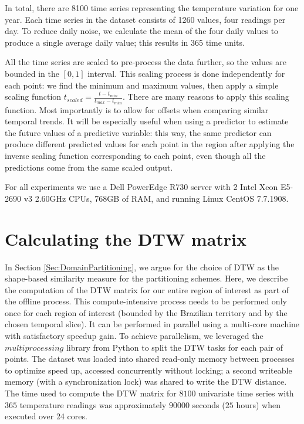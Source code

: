 In total, there are 8100 time series representing the temperature variation for one year. Each time series in the dataset consists of 1260 values, four readings per day. To reduce daily noise, we calculate the mean of the four daily values to produce a single average daily value; this results in 365 time units. 

All the time series are scaled to pre-process the data further, so the values are bounded in the $[0, 1]$ interval. This scaling process is done independently for each point: we find the minimum and maximum values, then apply a simple scaling function $ t_{scaled} = \frac{t-t_{min}}{t_{max}-t_{min}}$. There are many reasons to apply this scaling function. Most importantly is to allow for offsets when comparing similar temporal trends. It will be especially useful when using a predictor to estimate the future values of a predictive variable: this way, the same predictor can produce different predicted values for each point in the region after applying the inverse scaling function corresponding to each point, even though all the predictions come from the same scaled output.

For all experiments we use a Dell PowerEdge R730 server with 2 Intel Xeon E5-2690 v3 \@ 2.60GHz CPUs, 768GB of RAM, and running Linux CentOS 7.7.1908. 

\section{Calculating the DTW matrix}
\label{Sec:Calculating_DTW}

In Section \ref{Sec:DomainPartitioning}, we argue for the choice of DTW as the shape-based similarity measure for the partitioning schemes. Here, we describe the computation of the DTW matrix for our entire region of interest as part of the offline process. This compute-intensive process needs to be performed only once for each region of interest (bounded by the Brazilian territory and by the chosen temporal slice). It can be performed in parallel using a multi-core machine with satisfactory speedup gain. To achieve parallelism, we leveraged the $multiprocessing$ library from Python to split the DTW tasks for each pair of points. The dataset was loaded into shared read-only memory between processes to optimize speed up, accessed concurrently without locking; a second writeable memory (with a synchronization lock) was shared to write the DTW distance. The time used to compute the DTW matrix for $8100$ univariate time series with $365$ temperature readings was approximately $90000$ seconds ($25$ hours) when executed over 24 cores.

